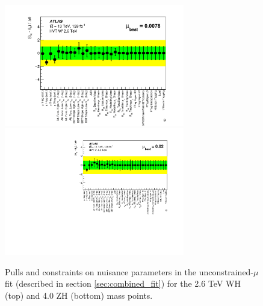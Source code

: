 \begin{figure}[htbp!]
    \begin{center}
        \includegraphics[width=0.7\textwidth]{Pulls_UnconditionalMu_WH_2600.png} \\
        \includegraphics[width=0.7\textwidth]{Pulls_UnconditionalMu_ZH_4000.pdf}
    \end{center}
    \caption{
        Pulls and constraints on nuisance parameters in the unconstrained-$\mu$ fit (described in section \ref{sec:combined_fit}) for the 2.6 TeV WH (top) and 4.0 ZH (bottom) mass points.
    }
    \label{fig:pull_plots}
\end{figure}

